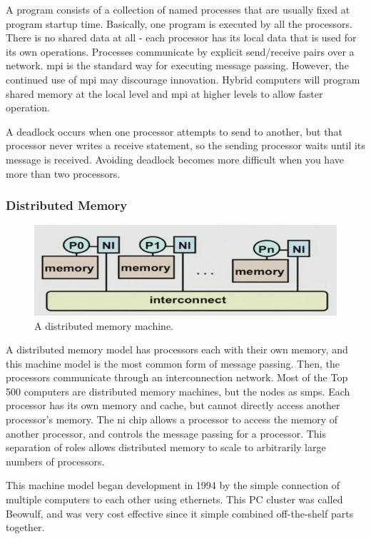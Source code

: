 \documentclass[10pt]{article}
\begin{document}
\begin{flushleft}
A program consists of a collection of named processes that are usually fixed at program startup time. Basically, one program is executed by all the processors. There is no shared data at all - each processor has its local data that is used for its own operations. Processes communicate by explicit send/receive pairs over a network. \gls{mpi} is the standard way for executing message passing. However, the continued use of \gls{mpi} may discourage innovation. Hybrid computers will program shared memory at the local level and \gls{mpi} at higher levels to allow faster operation.

A deadlock occurs when one processor attempts to send to another, but that processor never writes a receive statement, so the sending processor waits until its message is received. Avoiding deadlock becomes more difficult when you have more than two processors. 

\subsubsection{Distributed Memory}

\begin{figure}[H]
\centering
\includegraphics[width=0.5\linewidth]{figures/distributed-memory.pdf}
\caption{A distributed memory machine.}
\end{figure}

A distributed memory model has processors each with their own memory, and this machine model is the most common form of message passing. Then, the processors communicate through an interconnection network. Most of the Top 500 computers are distributed memory machines, but the nodes as \gls{smp}s. Each processor has its own memory and cache, but cannot directly access another processor's memory. The \gls{ni} chip allows a processor to access the memory of another processor, and controls the message passing for a processor. This separation of roles allows distributed memory to scale to arbitrarily large numbers of processors.

This machine model began development in 1994 by the simple connection of multiple computers to each other using ethernets. This PC cluster was called Beowulf, and was very cost effective since it simple combined off-the-shelf parts together. 


\end{flushleft}
\end{document}
